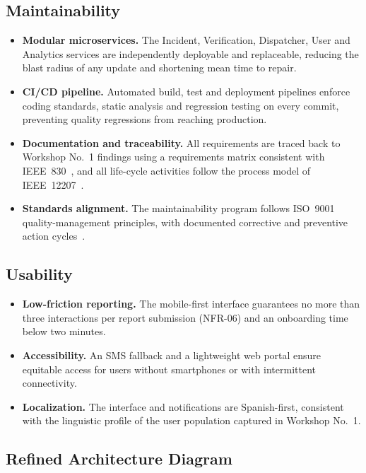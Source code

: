 \documentclass[conference,a4paper,10pt]{IEEEtran}
\begin{document}
\subsection{Maintainability}
\begin{itemize}[leftmargin=*]
  \item \textbf{Modular microservices.} The Incident, Verification, Dispatcher,
  User and Analytics services are independently deployable and replaceable,
  reducing the blast radius of any update and shortening mean time to repair.
  \item \textbf{CI/CD pipeline.} Automated build, test and deployment pipelines
  enforce coding standards, static analysis and regression testing on every
  commit, preventing quality regressions from reaching production.
  \item \textbf{Documentation and traceability.} All requirements are traced
  back to Workshop No.\ 1 findings using a requirements matrix consistent
  with IEEE~830~\cite{ieee830}, and all life-cycle activities follow the
  process model of IEEE~12207~\cite{ieee12207}.
  \item \textbf{Standards alignment.} The maintainability program follows
  ISO~9001 quality-management principles, with documented corrective and
  preventive action cycles~\cite{iso9001}.
\end{itemize}

\subsection{Usability}
\begin{itemize}[leftmargin=*]
  \item \textbf{Low-friction reporting.} The mobile-first interface guarantees
  no more than three interactions per report submission (NFR-06) and an
  onboarding time below two minutes.
  \item \textbf{Accessibility.} An SMS fallback and a lightweight web portal
  ensure equitable access for users without smartphones or with intermittent
  connectivity.
  \item \textbf{Localization.} The interface and notifications are
  Spanish-first, consistent with the linguistic profile of the user
  population captured in Workshop No.\ 1.
\end{itemize}

\subsection{Refined Architecture Diagram}
\end{document}
